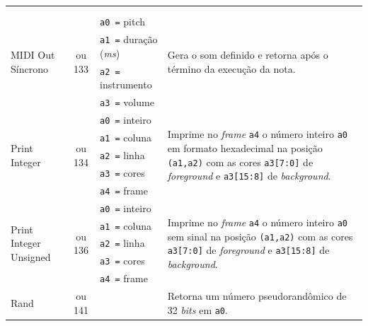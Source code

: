 \begin{longtable}{|l|c|p{3.5cm}|l |}
            & & & \\*
            & & & \\
        \hline
        \multirow{4}{*}{MIDI Out Síncrono }     & \multirow{4}{*}{\parbox{0.6cm}{ ou 133}}
              & \texttt{a0 =} pitch       & \multirow{4}{*}{\parbox{7cm}{Gera o som definido e retorna após o término da execução da nota.}}\\*
            & & \texttt{a1 =} duração (\textit{ms}) & \\*
            & & \texttt{a2 =} instrumento & \\*
            & & \texttt{a3 =} volume      & \\
        \hline
        \multirow{5}{*}{Print Integer}      & \multirow{5}{*}{\parbox{0.6cm}{ ou 134}}
              & \texttt{a0 =} inteiro     & \multirow{5}{*}{\parbox{7cm}{Imprime no \textit{frame} \texttt{a4} o número inteiro \texttt{a0} em formato hexadecimal na
                                                posição \texttt{(a1,a2)} com as cores \texttt{a3[7:0]} de \textit{foreground} e \texttt{a3[15:8]} de \textit{background}.}}\\*
            & & \texttt{a1 =} coluna      & \\*
            & & \texttt{a2 =} linha       & \\*
            & & \texttt{a3 =} cores       & \\*
            & & \texttt{a4 =} frame       & \\
        \hline
        \multirow{5}{*}{Print Integer Unsigned} & \multirow{5}{*}{\parbox{0.6cm}{ ou 136}}
              & \texttt{a0 =} inteiro     & \multirow{5}{*}{\parbox{7cm}{Imprime no \textit{frame} \texttt{a4} o número inteiro \texttt{a0} sem sinal na
                                                posição \texttt{(a1,a2)} com as cores \texttt{a3[7:0]} de \textit{foreground} e \texttt{a3[15:8]} de \textit{background}.}}\\*
            & & \texttt{a1 =} coluna      & \\*
            & & \texttt{a2 =} linha       & \\*
            & & \texttt{a3 =} cores       & \\*
            & & \texttt{a4 =} frame       & \\
        \hline
        \multirow{3}{*}{Rand}               & \multirow{3}{*}{\parbox{0.6cm}{ ou 141}}
            & & \multirow{3}{*}{\parbox{7cm}{Retorna um número pseudorandômico de 32 \textit{bits} em \texttt{a0}.}}\\*

\end{longtable}
